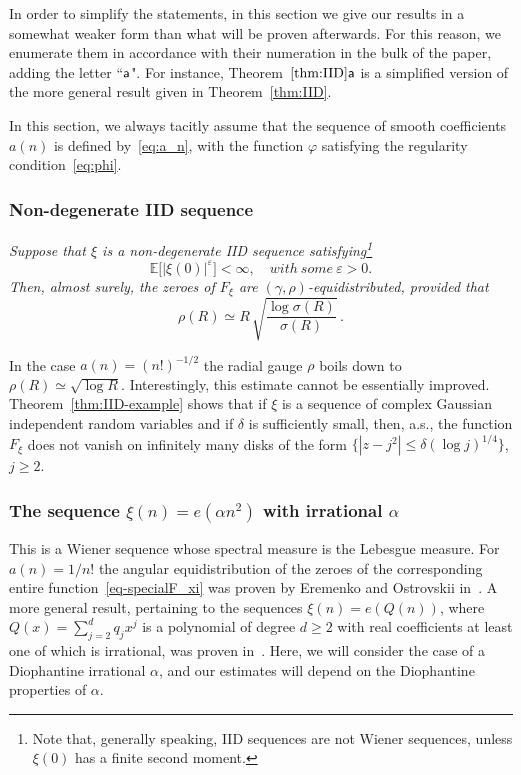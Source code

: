 \documentclass[11pt]{amsart}
\numberwithin{equation}{section}
\def\ep{{\varepsilon}}
\newcommand{\bE}{\mathbb E}
\begin{document}
In order to simplify the statements, in this section we give our results in a somewhat weaker
form than what will be proven afterwards. For this reason, we enumerate them in accordance with 
their numeration in the bulk of the paper, adding the letter ``$\sf a$". For instance,
Theorem~$\ref{thm:IID}\sf a$ is a simplified version of the more general result given in Theorem~\ref{thm:IID}.

In this section, we always tacitly assume that the sequence of smooth coefficients $a(n)$ is defined by~\eqref{eq:a_n}, with the function $\varphi$ satisfying the regularity condition~\eqref{eq:phi}.


\subsubsection{Non-degenerate IID sequence}
\phantom{A}\mbox{}

\medskip{}
{\em
Suppose that $\xi$ is a non-degenerate IID sequence satisfying\footnote{
Note that, generally speaking, IID sequences are not Wiener sequences,
unless $\xi(0)$ has a finite second moment.
}
\[
\bE\bigl[ |\xi(0)|^\ep \bigr]< \infty, \quad {with\ some\ } \ep>0.
\]
Then, almost surely, the zeroes of $F_\xi$ are $(\gamma, \rho)$-equidistributed, 
provided that
\begin{equation}\label{eq:IID}
\rho(R) \simeq R\,\sqrt{\frac{\log\sigma(R)}{\sigma(R)}}\,.
\end{equation}
}\medskip

In the case $a(n) = (n!)^{-1/2}$ the radial gauge $\rho$
boils down to $\rho(R)\simeq\sqrt{\log R}$. Interestingly, this estimate cannot be essentially improved.
Theorem~\ref{thm:IID-example} shows that if $\xi$ is
a sequence of complex Gaussian independent random variables and if $\delta$ is sufficiently small, then,
a.s., the function $F_\xi$ does not vanish on infinitely many disks of the form
$\{ |z - j^2|\le \delta (\log j)^{1/4}\}$, $j\ge 2$.



\subsubsection{The sequence $\xi (n) = e(\alpha n^2)$ with irrational $\alpha$}
This is a Wiener sequence whose spectral measure is the Lebesgue measure.
For $a(n)=1/n!$ the angular equidistribution of the zeroes of
the corresponding entire function~\eqref{eq-specialF_xi} was proven by
Eremenko and Ostrovskii in~\cite{EO}.
A more general result, pertaining to the sequences $\xi (n) = e(Q(n))$, where $Q(x)=\sum_{j=2}^d
q_j x^j$ is a polynomial of degree $d\ge 2$ with real coefficients at least one of which
is irrational, was proven in~\cite[Theorem~1]{BNS}.
Here, we will consider the case of a Diophantine irrational $\alpha$, and
our estimates will depend on the Diophantine properties of $\alpha$.
\end{document}
